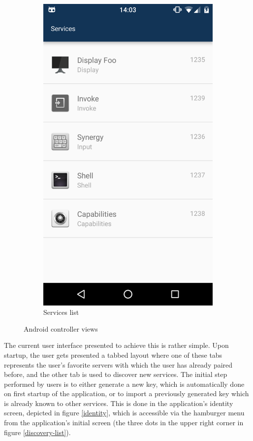 \begin{figure}
\begin{subfigure}{0.24\textwidth}
        \includegraphics[width=\linewidth]{resources/services-list.png}
        \caption{Services list}
        \label{services-list}
    \end{subfigure}

    \caption{Android controller views}
\end{figure}

The current user interface presented to achieve this is rather simple.
Upon startup, the user gets presented a tabbed layout where one of these tabs represents the user's favorite servers with which the user has already paired before, and the other tab is used to discover new services.
The initial step performed by users is to either generate a new key, which is automatically done on first startup of the application, or to import a previously generated key which is already known to other services.
This is done in the application's identity screen, depicted in figure \ref{identity}, which is accessible via the hamburger menu from the application's initial screen (the three dots in the upper right corner in figure \ref{discovery-list}).

